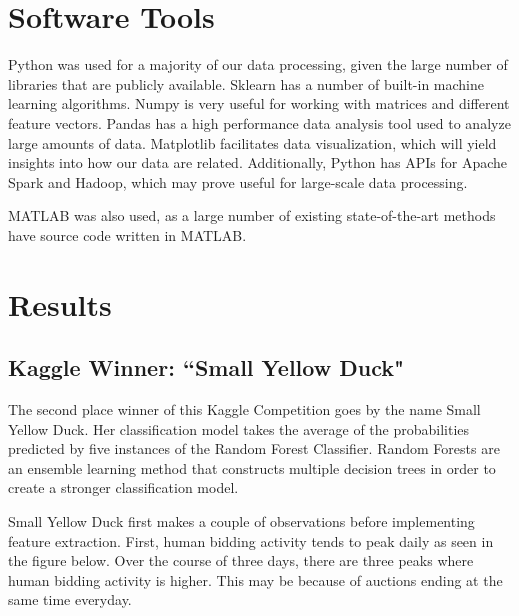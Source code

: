 \documentclass{article} %
\begin{document}
\section{Software Tools}

Python was used for a majority of our data processing, given the large number of libraries that are publicly available.
Sklearn has a number of built-in machine learning algorithms.
Numpy is very useful for working with matrices and different feature vectors.
Pandas has a high performance data analysis tool used to analyze large amounts of data.
Matplotlib facilitates data visualization, which will yield insights into how our data are related.
Additionally, Python has APIs for Apache Spark and Hadoop, which may prove useful for large-scale data processing.

MATLAB was also used, as a large number of existing state-of-the-art methods have source code written in MATLAB.

\section{Results}

\subsection{Kaggle Winner: ``Small Yellow Duck"}

The second place winner of this Kaggle Competition goes by the name Small Yellow Duck.
Her classification model takes the average of the probabilities predicted by five instances of the Random Forest Classifier.
Random Forests are an ensemble learning method that constructs multiple decision trees in order to create a stronger classification model.

Small Yellow Duck first makes a couple of observations before implementing feature extraction.
First, human bidding activity tends to peak daily as seen in the figure below.
Over the course of three days, there are three peaks where human bidding activity is higher.
This may be because of auctions ending at the same time everyday.
\end{document}
